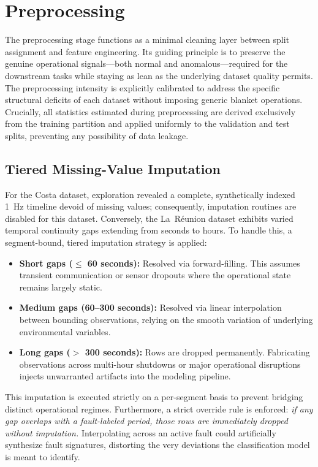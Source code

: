 \section{Preprocessing}
\label{sec:implementation-preprocessing}

The preprocessing stage functions as a minimal cleaning layer between split assignment and feature engineering. Its guiding principle is to preserve the genuine operational signals---both normal and anomalous---required for the downstream tasks while staying as lean as the underlying dataset quality permits. The preprocessing intensity is explicitly calibrated to address the specific structural deficits of each dataset without imposing generic blanket operations. Crucially, all statistics estimated during preprocessing are derived exclusively from the training partition and applied uniformly to the validation and test splits, preventing any possibility of data leakage.

\subsection{Tiered Missing-Value Imputation}
For the Costa dataset, exploration revealed a complete, synthetically indexed 1~Hz timeline devoid of missing values; consequently, imputation routines are disabled for this dataset. Conversely, the La~Réunion dataset exhibits varied temporal continuity gaps extending from seconds to hours. To handle this, a segment-bound, tiered imputation strategy is applied:
\begin{itemize}
    \item \textbf{Short gaps ($\le$ 60 seconds):} Resolved via forward-filling. This assumes transient communication or sensor dropouts where the operational state remains largely static.
    \item \textbf{Medium gaps (60--300 seconds):} Resolved via linear interpolation between bounding observations, relying on the smooth variation of underlying environmental variables.
    \item \textbf{Long gaps ($>$ 300 seconds):} Rows are dropped permanently. Fabricating observations across multi-hour shutdowns or major operational disruptions injects unwarranted artifacts into the modeling pipeline.
\end{itemize}
This imputation is executed strictly on a per-segment basis to prevent bridging distinct operational regimes. Furthermore, a strict override rule is enforced: \emph{if any gap overlaps with a fault-labeled period, those rows are immediately dropped without imputation.} Interpolating across an active fault could artificially synthesize fault signatures, distorting the very deviations the classification model is meant to identify.

